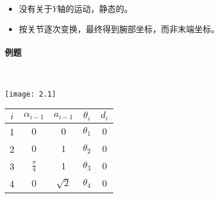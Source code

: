 \documentclass[
12pt, %
a4paper, 
oneside, %
headinclude,footinclude, %
]{scrartcl}
\begin{document}
\begin{itemize}
\item 没有关于$ Y $轴的运动，静态的。
\item 按关节逐次变换，最终得到腕部坐标，而非末端坐标。
\end{itemize} 
\paragraph{例题}\label{sec:example2.1}~\\
\begin{minipage}{0.48\textwidth}
\centering
\texttt{[image: 2.1]}
\end{minipage}
\hfill
\begin{minipage}{0.48\textwidth}
\centering
{}
\begin{tabular}{c|cccc}
\hline
$ i $ & $ \alpha_{i - 1} $ & $ a_{i - 1} $ & $ \theta_i $ & $ d_i $ \\
\hline
1 & $ 0 $ & $ 0 $ & $ \theta_1 $ & $ 0 $ \\
2 & $ 0 $ & $ 1 $ & $ \theta_2 $ & $ 0 $ \\
3 & $ \frac{\pi}{4} $ & $ 1 $ & $ \theta_3 $ & $ 0 $ \\
4 & $ 0 $ & $ \sqrt{2} $ & $ \theta_4 $ & $ 0 $ \\
\hline
\end{tabular}
\end{minipage}
\end{document}
